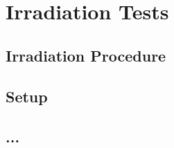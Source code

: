 \chapter{Irradiation Tests}
\label{chap:irradiation_tests}

    \section{Irradiation Procedure}

    \section{Setup}
    
    \section{...}

